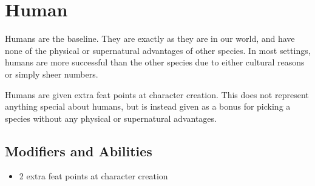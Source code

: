\section{Human}\label{human}
Humans are the baseline. They are exactly as they are in our world, and have
none of the physical or supernatural advantages of other species. In most
settings, humans are more successful than the other species due to either
cultural reasons or simply sheer numbers.

Humans are given extra feat points at character creation. This does not
represent anything special about humans, but is instead given as a bonus for
picking a species without any physical or supernatural advantages.

\subsection*{Modifiers and Abilities}
\begin{itemize}
    \item 2 extra feat points at character creation
\end{itemize}
